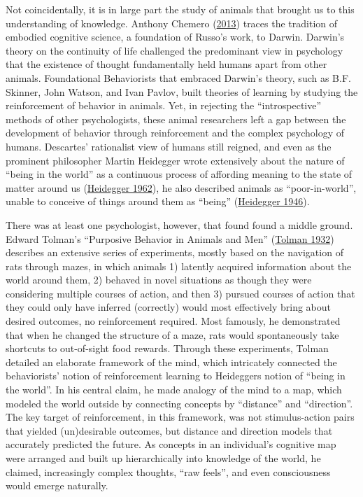 \documentclass[twoside,12pt,final]{ucthesis-CA2012}
\begin{document}
\begin{ucmainmatter}
Not coincidentally, it is in large part the study of animals that brought us to this understanding of knowledge. Anthony Chemero (\protect\hyperlink{ref-chemero2013}{2013}) traces the tradition of embodied cognitive science, a foundation of Russo's work, to Darwin. Darwin's theory on the continuity of life challenged the predominant view in psychology that the existence of thought fundamentally held humans apart from other animals. Foundational Behaviorists that embraced Darwin's theory, such as B.F. Skinner, John Watson, and Ivan Pavlov, built theories of learning by studying the reinforcement of behavior in animals. Yet, in rejecting the ``introspective'' methods of other psychologists, these animal researchers left a gap between the development of behavior through reinforcement and the complex psychology of humans. Descartes' rationalist view of humans still reigned, and even as the prominent philosopher Martin Heidegger wrote extensively about the nature of ``being in the world'' as a continuous process of affording meaning to the state of matter around us (\protect\hyperlink{ref-heidegger1962being}{Heidegger 1962}), he also described animals as ``poor-in-world'', unable to conceive of things around them as ``being'' (\protect\hyperlink{ref-heidegger1993letter}{Heidegger 1946}).

There was at least one psychologist, however, that found found a middle ground. Edward Tolman's ``Purposive Behavior in Animals and Men'' (\protect\hyperlink{ref-tolman1951purposive}{Tolman 1932}) describes an extensive series of experiments, mostly based on the navigation of rats through mazes, in which animals 1) latently acquired information about the world around them, 2) behaved in novel situations as though they were considering multiple courses of action, and then 3) pursued courses of action that they could only have inferred (correctly) would most effectively bring about desired outcomes, no reinforcement required. Most famously, he demonstrated that when he changed the structure of a maze, rats would spontaneously take shortcuts to out-of-sight food rewards. Through these experiments, Tolman detailed an elaborate framework of the mind, which intricately connected the behaviorists' notion of reinforcement learning to Heideggers notion of ``being in the world''. In his central claim, he made analogy of the mind to a map, which modeled the world outside by connecting concepts by ``distance'' and ``direction''. The key target of reinforcement, in this framework, was not stimulus-action pairs that yielded (un)desirable outcomes, but distance and direction models that accurately predicted the future. As concepts in an individual's cognitive map were arranged and built up hierarchically into knowledge of the world, he claimed, increasingly complex thoughts, ``raw feels'', and even consciousness would emerge naturally.


\end{ucmainmatter}
\end{document}
